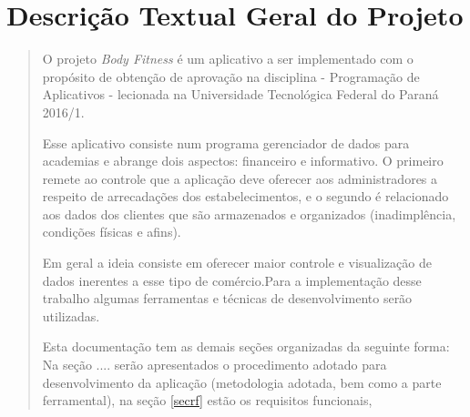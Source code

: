 \section{Descrição Textual Geral do Projeto }
\begin{quotation}
O projeto \textit{Body Fitness} é um aplicativo a ser implementado com o propósito de obtenção de aprovação na disciplina - Programação de Aplicativos - lecionada na Universidade Tecnológica Federal do Paraná 2016/1.

Esse aplicativo consiste num programa gerenciador de dados para academias e abrange dois aspectos: financeiro e informativo. O primeiro remete ao controle que a aplicação deve oferecer aos administradores a respeito de arrecadações dos estabelecimentos, e o segundo é relacionado aos dados dos clientes que são armazenados e organizados (inadimplência, condições físicas e afins).

Em geral a ideia consiste em oferecer maior controle e visualização de dados inerentes a esse tipo de comércio.Para a implementação desse trabalho algumas ferramentas e técnicas de desenvolvimento serão utilizadas. 

Esta documentação tem as demais seções organizadas da seguinte forma: Na seção .... serão apresentados o procedimento adotado para desenvolvimento da aplicação (metodologia adotada, bem como a parte ferramental), na seção \ref{secrf} estão os requisitos funcionais,



\end{quotation}